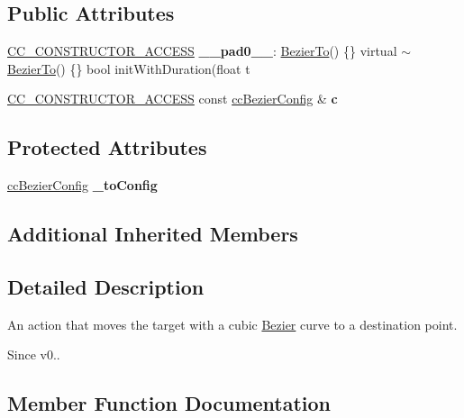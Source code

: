 \subsection*{Public Attributes}
\begin{DoxyCompactItemize}
\item 
\mbox{\label{classBezierTo_a8c0e2564830eaf4fa5092d1e7988dea3}} 
\hyperlink{_2cocos2d_2cocos_2base_2ccConfig_8h_a25ef1314f97c35a2ed3d029b0ead6da0}{C\+C\+\_\+\+C\+O\+N\+S\+T\+R\+U\+C\+T\+O\+R\+\_\+\+A\+C\+C\+E\+SS} {\bfseries \+\_\+\+\_\+pad0\+\_\+\+\_\+}\+: \hyperlink{classBezierTo}{Bezier\+To}() \{\} virtual $\sim$\hyperlink{classBezierTo}{Bezier\+To}() \{\} bool init\+With\+Duration(float t
\item 
\mbox{\label{classBezierTo_ae3aeda17e3f2be215dc23b923af10c09}} 
\hyperlink{_2cocos2d_2cocos_2base_2ccConfig_8h_a25ef1314f97c35a2ed3d029b0ead6da0}{C\+C\+\_\+\+C\+O\+N\+S\+T\+R\+U\+C\+T\+O\+R\+\_\+\+A\+C\+C\+E\+SS} const \hyperlink{struct__ccBezierConfig}{cc\+Bezier\+Config} \& {\bfseries c}
\end{DoxyCompactItemize}
\subsection*{Protected Attributes}
\begin{DoxyCompactItemize}
\item 
\mbox{\label{classBezierTo_ab2c8c3e0fa77abb129195ef52737e8fe}} 
\hyperlink{struct__ccBezierConfig}{cc\+Bezier\+Config} {\bfseries \+\_\+to\+Config}
\end{DoxyCompactItemize}
\subsection*{Additional Inherited Members}


\subsection{Detailed Description}
An action that moves the target with a cubic \hyperlink{structBezier}{Bezier} curve to a destination point. 

\begin{DoxySince}{Since}
v0.. 
\end{DoxySince}


\subsection{Member Function Documentation}
\mbox{\label{classBezierTo_ace522cd65d274c3f0a77c7925a2f12d5}} 
